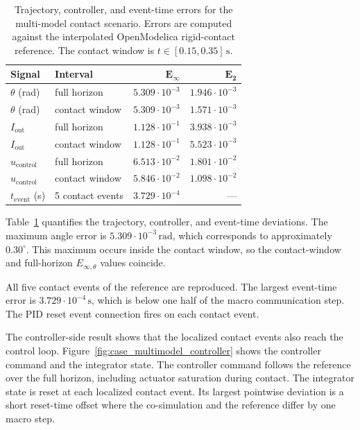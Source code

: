 \begin{table}[htbp]
    \centering
    \small
    \caption[Errors for the multi-model contact scenario]{Trajectory, controller, and event-time errors for the multi-model contact scenario.
    Errors are computed against the interpolated OpenModelica rigid-contact reference.
    The contact window is \(t\in[0.15,0.35]\,\mathrm{s}\).}
    \label{tab:case_multimodel_metrics}
    \begin{tabular}{llrr}
        \toprule
        \textbf{Signal} & \textbf{Interval} & \(\boldsymbol{E_\infty}\) & \(\boldsymbol{E_2}\) \\
        \midrule
        \(\theta\) (rad)           & full horizon     & \(5.309\cdot 10^{-3}\) & \(1.946\cdot 10^{-3}\) \\
        \(\theta\) (rad)           & contact window   & \(5.309\cdot 10^{-3}\) & \(1.571\cdot 10^{-3}\) \\
        \(I_{\mathrm{out}}\)       & full horizon     & \(1.128\cdot 10^{-1}\) & \(3.938\cdot 10^{-3}\) \\
        \(I_{\mathrm{out}}\)       & contact window   & \(1.128\cdot 10^{-1}\) & \(5.523\cdot 10^{-3}\) \\
        \(u_{\mathrm{control}}\)   & full horizon     & \(6.513\cdot 10^{-2}\) & \(1.801\cdot 10^{-2}\) \\
        \(u_{\mathrm{control}}\)   & contact window   & \(5.846\cdot 10^{-2}\) & \(1.098\cdot 10^{-2}\) \\
        \(t_{\mathrm{event}}\) (s) & 5 contact events & \(3.729\cdot 10^{-4}\) & --- \\
        \bottomrule
    \end{tabular}
\end{table}

Table~\ref{tab:case_multimodel_metrics} quantifies the trajectory, controller, and event-time deviations.
The maximum angle error is \(5.309\cdot 10^{-3}\,\mathrm{rad}\), which corresponds to approximately \(0.30^\circ\).
This maximum occurs inside the contact window, so the contact-window and full-horizon \(E_{\infty,\theta}\) values coincide.

All five contact events of the reference are reproduced.
The largest event-time error is \(3.729\cdot 10^{-4}\,\mathrm{s}\), which is below one half of the macro communication step.
The \ac{PID} reset event connection fires on each contact event.

The controller-side result shows that the localized contact events also reach the control loop.
Figure~\ref{fig:case_multimodel_controller} shows the controller command and the integrator state.
The controller command follows the reference over the full horizon, including actuator saturation during contact.
The integrator state is reset at each localized contact event.
Its largest pointwise deviation is a short reset-time offset where the co-simulation and the reference differ by one macro step.

